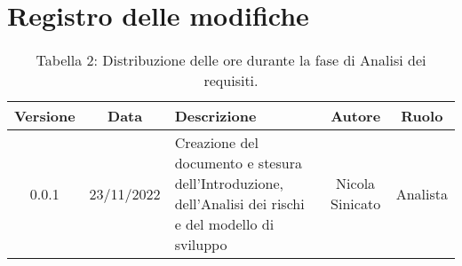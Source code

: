 \section*{Registro delle modifiche}
\begin{table}[h]
	\centering
	\renewcommand\tabularxcolumn[1]{>{\Centering}m{#1}}
	\begin{tabularx}{\textwidth}{| c | c | X | c | c |} 
	\hline
 	\textbf{Versione} & \textbf{Data} & \textbf{Descrizione} & \textbf{Autore} & \textbf{Ruolo}\\
 	\hline
	0.0.1 & 23/11/2022 & Creazione del documento e stesura dell'Introduzione, dell'Analisi dei rischi e del modello di sviluppo & Nicola Sinicato & Analista\\
 	\hline
	\end{tabularx}
	\vspace{10pt}
	\caption{Tabella 2: Distribuzione delle ore durante la fase di Analisi dei requisiti.}
\end{table}

